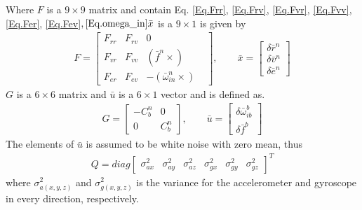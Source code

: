Where $F$ is a $9\times 9$ matrix and contain Eq. \eqref{Eq.Frr}, \eqref{Eq.Frv}, \eqref{Eq.Fvr}, \eqref{Eq.Fvv}, \eqref{Eq.Fer}, \eqref{Eq.Fev}$, \eqref{Eq.omega_in} \bar{x}$ is a $9 \times 1$ is given by
\begin{align}
F=
\begin{bmatrix}
F_{rr} & F_{rv} & 0 &\\
F_{vr} & F_{vv} & (\bar{f}^n \times)\\
F_{er} & F_{ev} & -(\bar{\omega}_{in}^n\times)
\end{bmatrix},
\qquad
\bar{x}=
\begin{bmatrix}
\delta\bar{r}^n \\
\delta\bar{v}^n\\
\delta\bar{e}^n
\end{bmatrix}
\end{align}
$G$ is a $6\times6$ matrix and $\bar{u}$ is a $6 \times 1$ vector and is defined as.
\begin{align}
G=
\begin{bmatrix}
-C_b^n & 0 \\
0 & C_b^n
\end{bmatrix},
\qquad
\bar{u}=
\begin{bmatrix}
\delta \bar{\omega}_{ib}^b \\
\delta \bar{f}^b 
\end{bmatrix}
\end{align}
The elements of $\bar{u}$ is assumed to be white noise with zero mean, thus
\begin{align}
Q=diag
\begin{bmatrix}
\sigma^2_{ax} & \sigma^2_{ay} & \sigma^2_{az} & \sigma^2_{gx} & \sigma^2_{gy} & \sigma^2_{gz}
\end{bmatrix}^T
\label{Eq.Q}
\end{align}
where $\sigma^2_{a(x,y,z)}$ and $\sigma^2_{g(x,y,z)}$ is the variance for the accelerometer and gyroscope in every direction, respectively.\\
	
